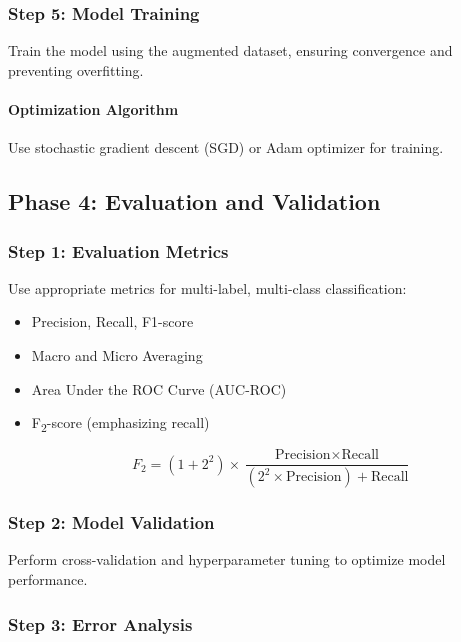 \documentclass[12pt, a4paper]{article}
\begin{document}
\subsubsection{Step 5: Model Training}

Train the model using the augmented dataset, ensuring convergence and preventing overfitting.

\paragraph{Optimization Algorithm}

Use stochastic gradient descent (SGD) or Adam optimizer for training.

\subsection{Phase 4: Evaluation and Validation}

\subsubsection{Step 1: Evaluation Metrics}

Use appropriate metrics for multi-label, multi-class classification:

\begin{itemize}
    \item Precision, Recall, F1-score
    \item Macro and Micro Averaging
    \item Area Under the ROC Curve (AUC-ROC)
    \item F\textsubscript{2}-score (emphasizing recall)

    \begin{equation}
    F_2 = (1 + 2^2) \times \frac{\text{Precision} \times \text{Recall}}{(2^2 \times \text{Precision}) + \text{Recall}}
    \end{equation}
\end{itemize}

\subsubsection{Step 2: Model Validation}

Perform cross-validation and hyperparameter tuning to optimize model performance.

\subsubsection{Step 3: Error Analysis}
\end{document}
